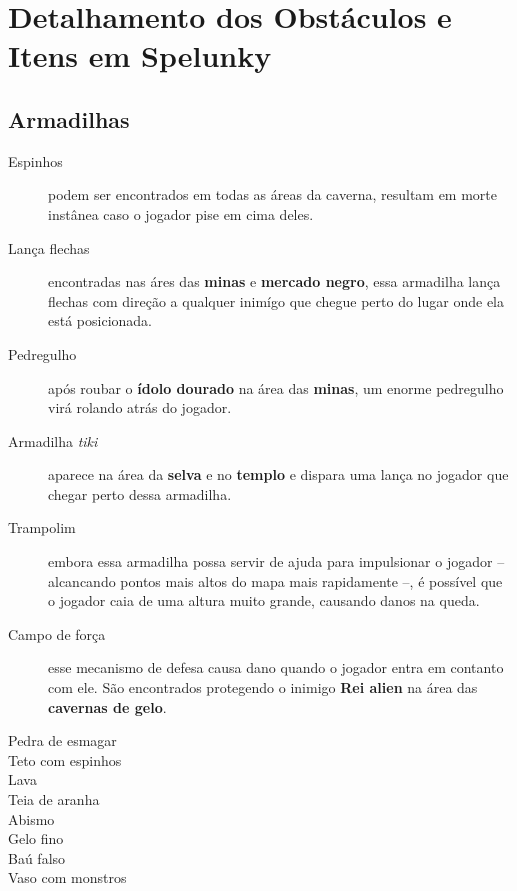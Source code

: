 \chapter{\label{appendix:spelunky-details}Detalhamento dos Obstáculos e
Itens em Spelunky}

\section{\label{section:spelunky-traps}Armadilhas}

\begin{description}
    \item[Espinhos]
        podem ser encontrados em todas as áreas da caverna, resultam em morte
        instânea caso o jogador pise em cima deles.
    \item[Lança flechas]
        encontradas nas áres das \textbf{minas} e \textbf{mercado negro}, essa
        armadilha lança flechas com direção a qualquer inimígo que chegue perto
        do lugar onde ela está posicionada.
    \item[Pedregulho]
        após roubar o \textbf{ídolo dourado} na área das \textbf{minas}, um
        enorme pedregulho virá rolando atrás do jogador.
    \item[Armadilha \textit{tiki}]
        aparece na área da \textbf{selva} e no \textbf{templo} e dispara uma
        lança no jogador que chegar perto dessa armadilha.
    \item[Trampolim]
        embora essa armadilha possa servir de ajuda para impulsionar o jogador
        -- alcancando pontos mais altos do mapa mais rapidamente --, é possível
        que o jogador caia de uma altura muito grande, causando danos na queda.
    \item[Campo de força]
        esse mecanismo de defesa causa dano quando o jogador entra em contanto
        com ele. São encontrados protegendo o inimigo \textbf{Rei alien} na
        área das \textbf{cavernas de gelo}.
    \item[Pedra de esmagar]
    \item[Teto com espinhos]
    \item[Lava]
    \item[Teia de aranha]
    \item[Abismo]
    \item[Gelo fino]
    \item[Baú falso]
    \item[Vaso com monstros]
\end{description}

